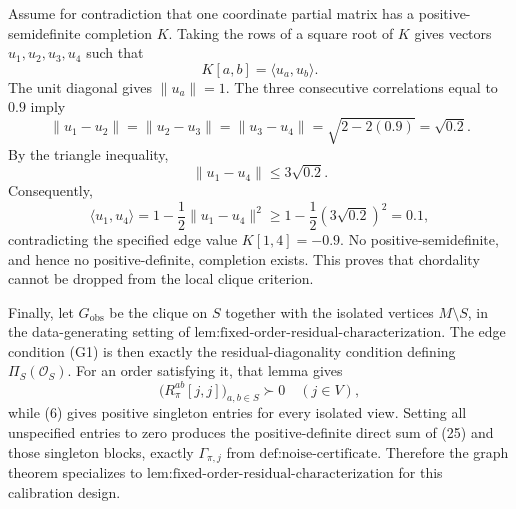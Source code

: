 Assume for contradiction that one coordinate partial matrix has a positive-semidefinite completion \(K\).  Taking the rows of a square root of \(K\) gives vectors \(u_1,u_2,u_3,u_4\) such that
\[
K[a,b]=\langle u_a,u_b\rangle.
\tag{21}
\]
The unit diagonal gives \(\lVert u_a\rVert=1\).  The three consecutive correlations equal to \(0.9\) imply
\[
\lVert u_1-u_2\rVert
=\lVert u_2-u_3\rVert
=\lVert u_3-u_4\rVert
=\sqrt{2-2(0.9)}=\sqrt{0.2}.
\tag{22}
\]
By the triangle inequality,
\[
\lVert u_1-u_4\rVert\le3\sqrt{0.2}.
\tag{23}
\]
Consequently,
\[
\langle u_1,u_4\rangle
=1-\frac12\lVert u_1-u_4\rVert^2
\ge 1-\frac12(3\sqrt{0.2})^2
=0.1,
\tag{24}
\]
contradicting the specified edge value \(K[1,4]=-0.9\).  No positive-semidefinite, and hence no positive-definite, completion exists.  This proves that chordality cannot be dropped from the local clique criterion.

Finally, let \(G_{\mathrm{obs}}\) be the clique on \(S\) together with the isolated vertices \(M\setminus S\), in the data-generating setting of \(\text{lem:fixed-order-residual-characterization}\).  The edge condition (G1) is then exactly the residual-diagonality condition defining \(\Pi_S(\mathcal O_S)\).  For an order satisfying it, that lemma gives
\[
\bigl(R_\pi^{ab}[j,j]\bigr)_{a,b\in S}\succ0
\quad(j\in V),
\tag{25}
\]
while (6) gives positive singleton entries for every isolated view.  Setting all unspecified entries to zero produces the positive-definite direct sum of (25) and those singleton blocks, exactly \(\Gamma_{\pi,j}\) from \(\text{def:noise-certificate}\).  Therefore the graph theorem specializes to \(\text{lem:fixed-order-residual-characterization}\) for this calibration design.
